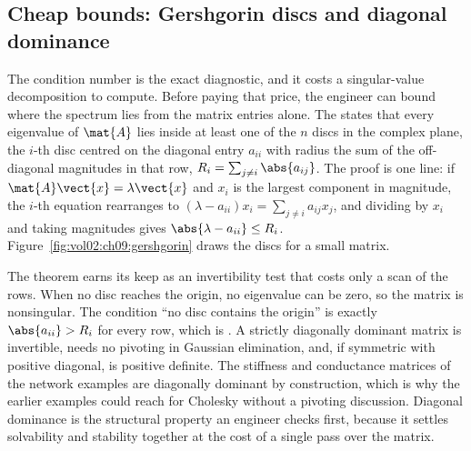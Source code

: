 \subsection{Cheap bounds: Gershgorin discs and diagonal dominance}

The condition number is the exact diagnostic, and it costs a
singular-value decomposition to compute. Before paying that price, the
engineer can bound where the spectrum lies from the matrix entries
alone. The  states that every
eigenvalue of $\mat{A}$ lies inside at least one of the $n$ discs in
the complex plane, the $i$-th disc centred on the diagonal entry
$a_{ii}$ with radius the sum of the off-diagonal magnitudes in that row,
$R_{i} = \sum_{j \neq i} \abs{a_{ij}}$. The proof is one line: if
$\mat{A}\vect{x} = \lambda\vect{x}$ and $x_{i}$ is the largest component
in magnitude, the $i$-th equation rearranges to $(\lambda - a_{ii})x_{i}
= \sum_{j \neq i} a_{ij}x_{j}$, and dividing by $x_{i}$ and taking
magnitudes gives $\abs{\lambda - a_{ii}} \leq R_{i}$.
Figure~\ref{fig:vol02:ch09:gershgorin} draws the discs for a small
matrix.

The theorem earns its keep as an invertibility test that costs only a
scan of the rows. When no disc reaches the origin, no eigenvalue can be
zero, so the matrix is nonsingular. The condition ``no disc contains the
origin'' is exactly $\abs{a_{ii}} > R_{i}$ for every row, which is
. A strictly diagonally dominant
matrix is invertible, needs no pivoting in Gaussian elimination, and, if
symmetric with positive diagonal, is positive definite. The stiffness
and conductance matrices of the network examples are diagonally
dominant by construction, which is why the earlier examples could reach
for Cholesky without a pivoting discussion. Diagonal dominance is the
structural property an engineer checks first, because it settles
solvability and stability together at the cost of a single pass over the
matrix.



